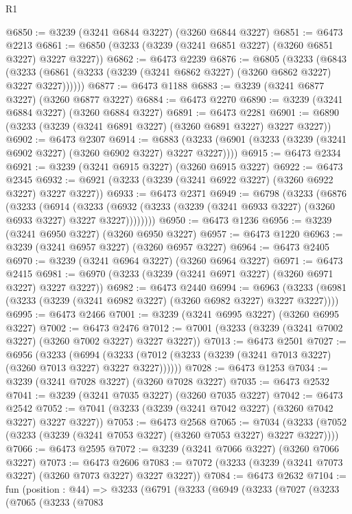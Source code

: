 \begin{lexlean}{R1}
\begin{coremodule}
@6850 := @3239 (@3241 @6844 @3227) (@3260 @6844 @3227)
@6851 := @6473 @2213
@6861 := @6850 (@3233 (@3239 (@3241 @6851 @3227) (@3260 @6851 @3227) @3227 @3227))
@6862 := @6473 @2239
@6876 := @6805
    (@3233
      (@6843 (@3233 (@6861 (@3233 (@3239 (@3241 @6862 @3227) (@3260 @6862 @3227) @3227 @3227))))))
@6877 := @6473 @1188
@6883 := @3239 (@3241 @6877 @3227) (@3260 @6877 @3227)
@6884 := @6473 @2270
@6890 := @3239 (@3241 @6884 @3227) (@3260 @6884 @3227)
@6891 := @6473 @2281
@6901 := @6890 (@3233 (@3239 (@3241 @6891 @3227) (@3260 @6891 @3227) @3227 @3227))
@6902 := @6473 @2307
@6914 := @6883 (@3233 (@6901 (@3233 (@3239 (@3241 @6902 @3227) (@3260 @6902 @3227) @3227 @3227))))
@6915 := @6473 @2334
@6921 := @3239 (@3241 @6915 @3227) (@3260 @6915 @3227)
@6922 := @6473 @2345
@6932 := @6921 (@3233 (@3239 (@3241 @6922 @3227) (@3260 @6922 @3227) @3227 @3227))
@6933 := @6473 @2371
@6949 := @6798
    (@3233
      (@6876
        (@3233
          (@6914
            (@3233 (@6932 (@3233 (@3239 (@3241 @6933 @3227) (@3260 @6933 @3227) @3227 @3227))))))))
@6950 := @6473 @1236
@6956 := @3239 (@3241 @6950 @3227) (@3260 @6950 @3227)
@6957 := @6473 @1220
@6963 := @3239 (@3241 @6957 @3227) (@3260 @6957 @3227)
@6964 := @6473 @2405
@6970 := @3239 (@3241 @6964 @3227) (@3260 @6964 @3227)
@6971 := @6473 @2415
@6981 := @6970 (@3233 (@3239 (@3241 @6971 @3227) (@3260 @6971 @3227) @3227 @3227))
@6982 := @6473 @2440
@6994 := @6963 (@3233 (@6981 (@3233 (@3239 (@3241 @6982 @3227) (@3260 @6982 @3227) @3227 @3227))))
@6995 := @6473 @2466
@7001 := @3239 (@3241 @6995 @3227) (@3260 @6995 @3227)
@7002 := @6473 @2476
@7012 := @7001 (@3233 (@3239 (@3241 @7002 @3227) (@3260 @7002 @3227) @3227 @3227))
@7013 := @6473 @2501
@7027 := @6956
    (@3233
      (@6994 (@3233 (@7012 (@3233 (@3239 (@3241 @7013 @3227) (@3260 @7013 @3227) @3227 @3227))))))
@7028 := @6473 @1253
@7034 := @3239 (@3241 @7028 @3227) (@3260 @7028 @3227)
@7035 := @6473 @2532
@7041 := @3239 (@3241 @7035 @3227) (@3260 @7035 @3227)
@7042 := @6473 @2542
@7052 := @7041 (@3233 (@3239 (@3241 @7042 @3227) (@3260 @7042 @3227) @3227 @3227))
@7053 := @6473 @2568
@7065 := @7034 (@3233 (@7052 (@3233 (@3239 (@3241 @7053 @3227) (@3260 @7053 @3227) @3227 @3227))))
@7066 := @6473 @2595
@7072 := @3239 (@3241 @7066 @3227) (@3260 @7066 @3227)
@7073 := @6473 @2606
@7083 := @7072 (@3233 (@3239 (@3241 @7073 @3227) (@3260 @7073 @3227) @3227 @3227))
@7084 := @6473 @2632
@7104 := fun (position : @44) =>
  @3233
    (@6791
      (@3233
        (@6949
          (@3233
            (@7027
              (@3233
                (@7065
                  (@3233
                    (@7083

\end{coremodule}
\end{lexlean}
